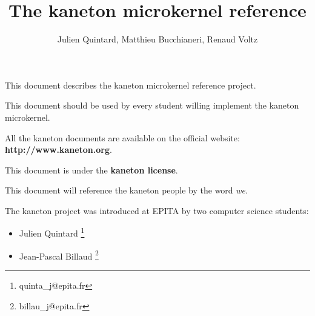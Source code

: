 
%
%



%
%

\rhead{}

%
%

\title{The kaneton microkernel reference
       \logos}

%
%

\author{\small{Julien Quintard},
        \small{Matthieu Bucchianeri},
        \small{Renaud Voltz}}

%
%



%
%

\maketitle

%
%

%
%

This document describes the kaneton microkernel reference project.

This document should be used by every student willing implement the
kaneton microkernel.

All the kaneton documents are available on the official website:
\textbf{http://www.kaneton.org}.

This document is under the \textbf{kaneton license}.

This document will reference the kaneton people by the word \textit{we}.

\newpage

The kaneton project was introduced at EPITA by two computer science
students:

\begin{itemize}
  \item
    Julien Quintard \footnote{quinta\_j@epita.fr}
  \item
    Jean-Pascal Billaud \footnote{billau\_j@epita.fr}
\end{itemize}

